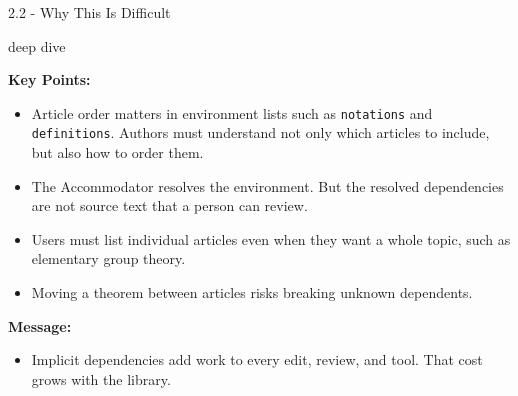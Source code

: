 \documentclass[aspectratio=169,11pt]{beamer}
\newcommand{\deepdivetag}{\hfill\colorbox{black!15}{\textcolor{black!65}{\strut\scriptsize\sffamily deep dive}}}
\begin{document}
\begin{frame}[fragile,t]{2.2 - Why This Is Difficult\deepdivetag}
\smallskip
\textbf{Key Points:}
\begin{itemize}
\setlength{\itemsep}{1pt}
\setlength{\parsep}{0pt}
\setlength{\parskip}{0pt}
\item Article order matters in environment lists such as \texttt{notations} and \texttt{definitions}. Authors must understand not only which articles to include, but also how to order them.
\item The Accommodator resolves the environment. But the resolved dependencies are not source text that a person can review.
\item Users must list individual articles even when they want a whole topic, such as elementary group theory.
\item Moving a theorem between articles risks breaking unknown dependents.
\end{itemize}
\smallskip
\textbf{Message:}
\begin{itemize}
\setlength{\itemsep}{1pt}
\setlength{\parsep}{0pt}
\setlength{\parskip}{0pt}
\item Implicit dependencies add work to every edit, review, and tool. That cost grows with the library.
\end{itemize}
\end{frame}
\end{document}
